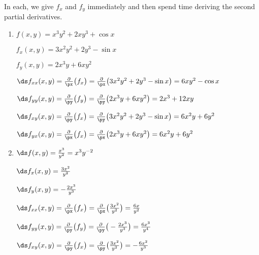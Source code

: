 

{In each, we give $f_x$ and $f_y$ immediately and then spend time deriving the second partial derivatives.
\begin{enumerate}
	\item $f(x,y) = x^3y^2+2xy^3+\cos x$
		
		$f_x(x,y) = 3x^2y^2+2y^3-\sin x$
		
		$f_y(x,y) = 2x^3y+6xy^2$
		
		$\ds f_{xx}(x,y) = \frac{\partial}{\px}\big(f_x\big) = \frac{\partial}{\px}\big(3x^2y^2+2y^3-\sin x\big) = 6xy^2-\cos x$
		
		$\ds f_{yy}(x,y) = \frac{\partial}{\py}\big(f_y\big) = \frac{\partial}{\py}\big(2x^3y+6xy^2\big) = 2x^3+12xy$
		
		$\ds f_{xy}(x,y) = \frac{\partial}{\py}\big(f_x\big) = \frac{\partial}{\py}\big(3x^2y^2+2y^3-\sin x\big) = 6x^2y+6y^2$
		
		$\ds f_{yx}(x,y) = \frac{\partial}{\px}\big(f_x\big) = \frac{\partial}{\px}\big(2x^3y+6xy^2\big) = 6x^2y+6y^2$

\enlargethispage{2\baselineskip}		
	\item		$\ds f(x,y) = \frac{x^3}{y^2} = x^3y^{-2}$
	
	$\ds f_x(x,y) = \frac{3x^2}{y^2}$
	
	$\ds f_y(x,y) = -\frac{2x^3}{y^3}$
	
	$\ds f_{xx}(x,y) = \frac{\partial}{\px}\big(f_x\big) = \frac{\partial}{\px}\big(\frac{3x^2}{y^2}\big) = \frac{6x}{y^2}$
		
		$\ds f_{yy}(x,y) = \frac{\partial}{\py}\big(f_y\big) = \frac{\partial}{\py}\big(-\frac{2x^3}{y^3}\big) = \frac{6x^3}{y^4}$
		
		$\ds f_{xy}(x,y) = \frac{\partial}{\py}\big(f_x\big) = \frac{\partial}{\py}\big(\frac{3x^2}{y^2}\big) = -\frac{6x^2}{y^3}$
		

\end{enumerate}}
